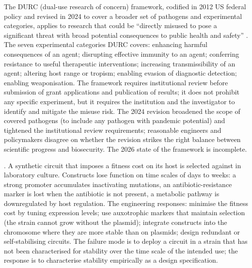 The DURC (dual-use research of concern) framework, codified in
2012 US federal policy and revised in 2024 to cover a broader set
of pathogens and experimental categories, applies to research that
could be ``directly misused to pose a significant threat with broad
potential consequences to public health and safety''
\cite[\S\,III]{web:v6c09-hhs-durc-2024}. The seven experimental
categories DURC covers: enhancing harmful consequences of an agent;
disrupting effective immunity to an agent; conferring resistance to
useful therapeutic interventions; increasing transmissibility of an
agent; altering host range or tropism; enabling evasion of
diagnostic detection; enabling weaponisation. The framework requires
institutional review before submission of grant applications and
publication of results; it does not prohibit any specific
experiment, but it requires the institution and the investigator
to identify and mitigate the misuse risk. The 2024 revision
broadened the scope of covered pathogens (to include any pathogen
with pandemic potential) and tightened the institutional review
requirements; reasonable engineers and policymakers disagree on
whether the revision strikes the right balance between scientific
progress and biosecurity. The 2026 state of the framework is
incomplete.

. A
synthetic circuit that imposes a fitness cost on its host is
selected against in laboratory culture. Constructs lose function on
time scales of days to weeks: a strong promoter accumulates
inactivating mutations, an antibiotic-resistance marker is lost when
the antibiotic is not present, a metabolic pathway is downregulated
by host regulation. The engineering responses: minimise the fitness
cost by tuning expression levels; use auxotrophic markers that
maintain selection (the strain cannot grow without the plasmid);
integrate constructs into the chromosome where they are more stable
than on plasmids; design redundant or self-stabilising circuits.
The failure mode is to deploy a circuit in a strain that has not
been characterised for stability over the time scale of the intended
use; the response is to characterise stability empirically as a
design specification.

